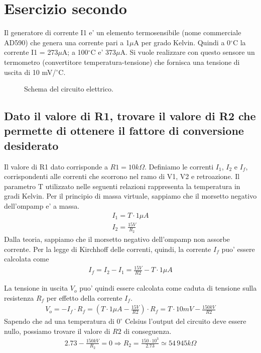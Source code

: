 \documentclass[a4paper,10pt]{article}
\begin{document}
\pagebreak

\section{Esercizio secondo}
Il generatore di corrente I1 e' un elemento termosensibile (nome commerciale AD590) che genera una corrente pari a 1$\mu$A per grado Kelvin. Quindi a 0$^{\circ}$C la corrente I1 = 273$\mu$A; a 100$^{\circ}$C e' 373$\mu$A.
Si vuole realizzare con questo sensore un termometro (convertitore temperatura-tensione) che fornisca una tensione di uscita di 10 mV/$^{\circ}$C.
\begin{figure}[h!]
	\centering
  	\caption{Schema del circuito elettrico.}
  	\label{fig:ckt2}
\end{figure}

\subsection{Dato il valore di R1, trovare il valore di R2 che permette di ottenere il fattore di conversione desiderato}
Il valore di R1 dato corrisponde a $R1=10k\Omega$. Definiamo le correnti $I_1$, $I_2$ e $I_f$, corrispondenti alle correnti che scorrono nel ramo di V1, V2 e retroazione. Il parametro T utilizzato nelle seguenti relazioni rappresenta la temperatura in gradi Kelvin. Per il principio di massa virtuale, sappiamo che il morsetto negativo dell'ompamp e' a massa. 
\begin{gather*}
I_1 = T \cdot 1\mu A \\
I_2 = \frac{15V}{R_2} 
\end{gather*}
Dalla teoria, sappiamo che il morsetto negativo dell'ompamp non assorbe corrente. Per la legge di Kirchhoff delle correnti, quindi, la corrente $I_f$ puo' essere calcolata come
\begin{align*}
I_f = I_2 - I_1 = \frac{15V}{R2} - T\cdot 1\mu A
\end{align*}

La tensione in uscita $V_o$ puo' quindi essere calcolata come caduta di tensione sulla resistenza $R_f$ per effetto della corrente $I_f$. 
\begin{align*}
V_o = -I_f \cdot R_f = (T\cdot 1\mu A - \frac{15V}{R2}) \cdot R_f = T\cdot 10mV - \frac{150kV}{R2}
\end{align*}
Sapendo che ad una temperatura di $0^{\circ}$ Celsius l'output del circuito deve essere nullo, possiamo trovare il valore di $R2$ di conseguenza.
\begin{align*}
2.73 - \frac{150kV}{R_2} = 0 \Rightarrow R_2 = \frac{150\cdot 10^3}{2.73} \simeq 54\,945k\Omega
\end{align*}
\end{document}
